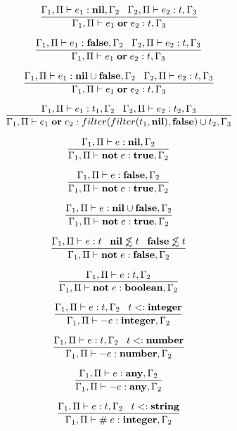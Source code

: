 \[
\dfrac{\Gamma_{1}, \Pi \vdash e_{1}:\mathbf{nil}, \Gamma_{2} \;\;\;
       \Gamma_{2}, \Pi \vdash e_{2}:t, \Gamma_{3}}
      {\Gamma_{1}, \Pi \vdash e_{1} \; \mathbf{or} \; e_{2}:t, \Gamma_{3}}
\]

\[
\dfrac{\Gamma_{1}, \Pi \vdash e_{1}:\mathbf{false}, \Gamma_{2} \;\;\;
       \Gamma_{2}, \Pi \vdash e_{2}:t, \Gamma_{3}}
      {\Gamma_{1}, \Pi \vdash e_{1} \; \mathbf{or} \; e_{2}:t, \Gamma_{3}}
\]

\[
\dfrac{\Gamma_{1}, \Pi \vdash e_{1}:\mathbf{nil} \cup \mathbf{false}, \Gamma_{2} \;\;\;
       \Gamma_{2}, \Pi \vdash e_{2}:t, \Gamma_{3}}
      {\Gamma_{1}, \Pi \vdash e_{1} \; \mathbf{or} \; e_{2}:t, \Gamma_{3}}
\]

\[
\dfrac{\Gamma_{1}, \Pi \vdash e_{1}:t_{1}, \Gamma_{2} \;\;\;
       \Gamma_{2}, \Pi \vdash e_{2}:t_{2}, \Gamma_{3}}
      {\Gamma_{1}, \Pi \vdash e_{1} \; \mathbf{or} \; e_{2}:filter(filter(t_{1}, \mathbf{nil}), \mathbf{false}) \cup t_{2}, \Gamma_{3}}
\]

\[
\dfrac{\Gamma_{1}, \Pi \vdash e:\mathbf{nil}, \Gamma_{2}}
      {\Gamma_{1}, \Pi \vdash \mathbf{not} \; e:\mathbf{true}, \Gamma_{2}}
\]

\[
\dfrac{\Gamma_{1}, \Pi \vdash e:\mathbf{false}, \Gamma_{2}}
      {\Gamma_{1}, \Pi \vdash \mathbf{not} \; e:\mathbf{true}, \Gamma_{2}}
\]

\[
\dfrac{\Gamma_{1}, \Pi \vdash e:\mathbf{nil} \cup \mathbf{false}, \Gamma_{2}}
      {\Gamma_{1}, \Pi \vdash \mathbf{not} \; e:\mathbf{true}, \Gamma_{2}}
\]

\[
\dfrac{\Gamma_{1}, \Pi \vdash e:t \;\;\;
       \mathbf{nil} \not\lesssim t \;\;\;
       \mathbf{false} \not\lesssim t}
      {\Gamma_{1}, \Pi \vdash \mathbf{not} \; e:\mathbf{false}, \Gamma_{2}}
\]

\[
\dfrac{\Gamma_{1}, \Pi \vdash e:t, \Gamma_{2}}
      {\Gamma_{1}, \Pi \vdash \mathbf{not} \; e:\mathbf{boolean}, \Gamma_{2}}
\]

\[
\dfrac{\Gamma_{1}, \Pi \vdash e:t, \Gamma_{2} \;\;\;
       t <: \mathbf{integer}}
      {\Gamma_{1}, \Pi \vdash - e:\mathbf{integer}, \Gamma_{2}}
\]

\[
\dfrac{\Gamma_{1}, \Pi \vdash e:t, \Gamma_{2} \;\;\;
       t <: \mathbf{number}}
      {\Gamma_{1}, \Pi \vdash - e:\mathbf{number}, \Gamma_{2}}
\]

\[
\dfrac{\Gamma_{1}, \Pi \vdash e:\mathbf{any}, \Gamma_{2}}
      {\Gamma_{1}, \Pi \vdash - e:\mathbf{any}, \Gamma_{2}}
\]

\[
\dfrac{\Gamma_{1}, \Pi \vdash e:t, \Gamma_{2} \;\;\;
       t <: \mathbf{string}}
      {\Gamma_{1}, \Pi \vdash \# \; e:\mathbf{integer}, \Gamma_{2}}
\]

